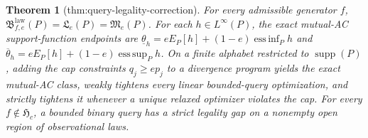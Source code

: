 \documentclass{article}
\newtheorem{theorem}{Theorem}
\begin{document}
\begin{theorem}[thm:query-legality-correction]\label{thm:query-legality-correction}
For every admissible generator \(f\), \(\mathfrak B^{\mathrm{law}}_{f,e}(P)=\mathfrak L_e(P)=\mathfrak M_e(P)\). For each \(h\in L^\infty(P)\), the exact mutual-AC support-function endpoints are \(\underline\theta_h=eE_P[h]+(1-e)\operatorname*{ess\,inf}_P h\) and \(\overline\theta_h=eE_P[h]+(1-e)\operatorname*{ess\,sup}_P h\). On a finite alphabet restricted to \(\operatorname{supp}(P)\), adding the cap constraints \(q_j\ge ep_j\) to a divergence program yields the exact mutual-AC class, weakly tightens every linear bounded-query optimization, and strictly tightens it whenever a unique relaxed optimizer violates the cap. For every \(f\notin\mathfrak H_c\), a bounded binary query has a strict legality gap on a nonempty open region of observational laws.
\end{theorem}
\end{document}
